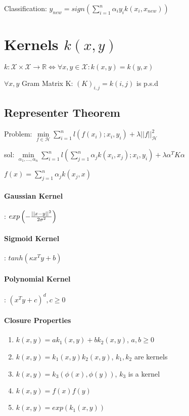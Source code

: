\documentclass[11pt,twocolumn]{article}
\begin{document}
Classification: $y_{new} = sign(  \sum \limits_{i=1}^n \alpha_i y_i  k(x_i, x_{new})  )$

\section{Kernels $k(x,y)$}

$k: \mathcal{X} \times \mathcal{X} \rightarrow \mathbb{R}  \Leftrightarrow \forall x,y \in \mathcal{X} : k\left( x , y \right) = k \left(y,x\right)$

$\forall x, y$
Gram Matrix K: $(K)_{i,j} = k(i,j)$ is p.s.d

\subsection{Representer Theorem}

Problem: $\min \limits_{f \in \mathcal{H}} \sum \limits_{i=1}^n l(f(x_i);x_i, y_i) + \lambda || f||_{\mathcal{H}}^2$

sol: $\min \limits_{\alpha_1,...,\alpha_n} \sum \limits_{i=1}^n l \left( \sum \limits_{j=1}^n \alpha_j k(x_i, x_j);x_i,y_i  \right) + \lambda \alpha^T K \alpha$

$f(x) = \sum \limits_{j=1}^n \alpha_j k(x_j, x)$

\paragraph{Gaussian Kernel}: $exp\left( - {{||x-y||^2}\over{2 \sigma^2}} \right)$ 


\paragraph{Sigmoid Kernel}: $tanh(\kappa x^T y + b)$

\paragraph{Polynomial Kernel}: $\left( x^Ty + c \right)^d, c \geq 0$

\paragraph{Closure Properties}

\begin{enumerate}
\item $k(x,y) = a k_1(x,y) + b k_2(x,y)$, $a,b \geq 0$
\item $k(x,y) =  k_1(x,y)  k_2(x,y)$, $k_1, k_2$ are kernels
\item $k(x,y) =  k_3(\phi(x),  \phi(y))$, $k_3$ is a kernel
\item $k(x,y) =  f(x) f(y)$
\item $k(x,y) =  exp(k_1(x,y))$
\end{enumerate}
\end{document}

